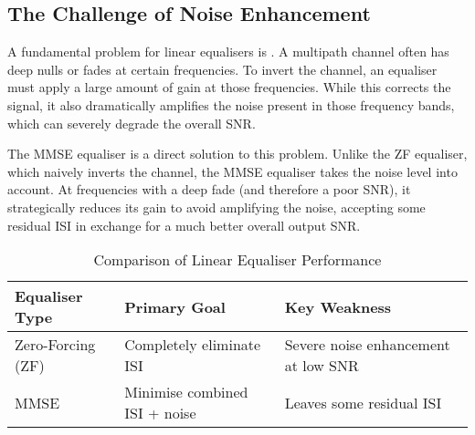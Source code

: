 \subsection{The Challenge of Noise Enhancement}

A fundamental problem for linear equalisers is . A multipath channel often has deep nulls or fades at certain frequencies. To invert the channel, an equaliser must apply a large amount of gain at those frequencies. While this corrects the signal, it also dramatically amplifies the noise present in those frequency bands, which can severely degrade the overall SNR.

The MMSE equaliser is a direct solution to this problem. Unlike the ZF equaliser, which naively inverts the channel, the MMSE equaliser takes the noise level into account. At frequencies with a deep fade (and therefore a poor SNR), it strategically reduces its gain to avoid amplifying the noise, accepting some residual ISI in exchange for a much better overall output SNR.

\begin{table}[H]
    \centering
    \caption{Comparison of Linear Equaliser Performance}
    \label{tab:equaliser-comparison}
    \begin{tabular}{@{}lll@{}}
        \toprule
        \tableheaderfont Equaliser Type & \tableheaderfont Primary Goal & \tableheaderfont Key Weakness \\
        \midrule
        Zero-Forcing (ZF) & Completely eliminate ISI & Severe noise enhancement at low SNR \\
        MMSE & Minimise combined ISI + noise & Leaves some residual ISI \\
        \bottomrule
    \end{tabular}
\end{table}


